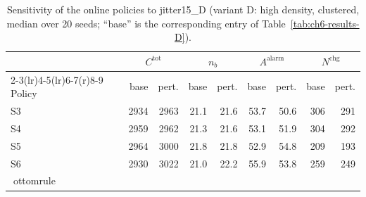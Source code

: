 \begin{table}[htbp]
\centering
\caption{Sensitivity of the online policies to jitter15_D (variant D: high density, clustered,
median over 20 seeds; ``base'' is the corresponding entry of
Table~\ref{tab:ch6-results-D}).}
\label{tab:ch6-sens-D-jitter15}
\footnotesize
\begin{tabular}{@{}l rr rr rr rr@{}}
\toprule
& \multicolumn{2}{c}{$C^{\mathrm{tot}}$} & \multicolumn{2}{c}{$n_b$}
  & \multicolumn{2}{c}{$A^{\mathrm{alarm}}$} & \multicolumn{2}{c}{$N^{\mathrm{chg}}$} \\
\cmidrule(r){2-3}\cmidrule(lr){4-5}\cmidrule(lr){6-7}\cmidrule(r){8-9}
Policy & base & pert. & base & pert. & base & pert. & base & pert. \\
\midrule

S3 & 2934 & 2963 & 21.1 & 21.6 & 53.7 & 50.6 & 306 & 291 \\
S4 & 2959 & 2962 & 21.3 & 21.6 & 53.1 & 51.9 & 304 & 292 \\
S5 & 2964 & 3000 & 21.8 & 21.8 & 52.9 & 54.8 & 209 & 193 \\
S6 & 2930 & 3022 & 21.0 & 22.2 & 55.9 & 53.8 & 259 & 249 \\
ottomrule
\end{tabular}
\end{table}
